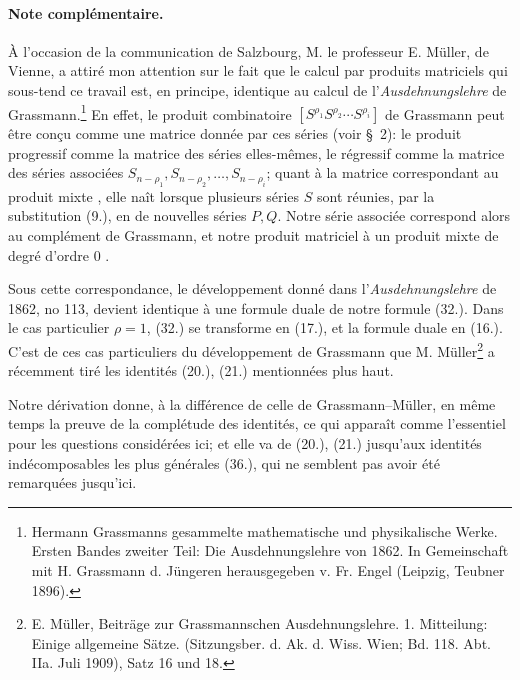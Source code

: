 \documentclass[11pt]{article}
\begin{document}
\paragraph{Note complémentaire.} À l'occasion de la communication de Salzbourg, M. le professeur E. Müller, de Vienne, a attiré mon attention sur le fait que le calcul par produits matriciels qui sous-tend ce travail est, en principe, identique au calcul de l'\emph{Ausdehnungslehre} de Grassmann.\footnote{Hermann Grassmanns gesammelte mathematische und physikalische Werke. Ersten Bandes zweiter Teil: Die Ausdehnungslehre von 1862. In Gemeinschaft mit H. Grassmann d. Jüngeren herausgegeben v. Fr. Engel (Leipzig, Teubner 1896).} En effet, le \og produit combinatoire \fg{} $[S^{\rho_1}S^{\rho_2}\cdots S^{\rho_i}]$ de Grassmann peut être conçu comme une matrice donnée par ces séries (voir \S\ 2): le \og produit progressif \fg{} comme la matrice des séries elles-mêmes, le \og régressif \fg{} comme la matrice des séries associées $S_{n-\rho_1},S_{n-\rho_2},\ldots,S_{n-\rho_i}$; quant à la matrice correspondant au \og produit mixte \fg{}, elle naît lorsque plusieurs séries $S$ sont réunies, par la substitution (9.), en de nouvelles séries $P,Q$. Notre \og série associée \fg{} correspond alors au \og complément \fg{} de Grassmann, et notre \og produit matriciel \fg{} à un \og produit mixte de degré d'ordre 0 \fg{}.

Sous cette correspondance, le développement donné dans l'\emph{Ausdehnungslehre} de 1862, no 113, devient identique à une formule duale de notre formule (32.). Dans le cas particulier $\rho=1$, (32.) se transforme en (17.), et la formule duale en (16.). C'est de ces cas particuliers du développement de Grassmann que M. Müller\footnote{E. Müller, Beiträge zur Grassmannschen Ausdehnungslehre. 1. Mitteilung: Einige allgemeine Sätze. (Sitzungsber. d. Ak. d. Wiss. Wien; Bd. 118. Abt. IIa. Juli 1909), Satz 16 und 18.} a récemment tiré les identités (20.), (21.) mentionnées plus haut.

Notre dérivation donne, à la différence de celle de Grassmann--Müller, en même temps la preuve de la complétude des identités, ce qui apparaît comme l'essentiel pour les questions considérées ici; et elle va de (20.), (21.) jusqu'aux identités indécomposables les plus générales (36.), qui ne semblent pas avoir été remarquées jusqu'ici.

\clearpage
\end{document}
